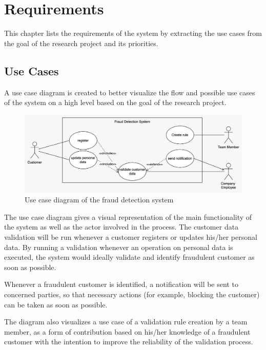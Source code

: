 \section{Requirements}

  This chapter lists the requirements of the system by extracting the use cases from the goal of the research project and its priorities. 

  \subsection{Use Cases}
    \label{use_cases}

    A use case diagram is created to better visualize the flow and possible use cases of the system on a high level based on the goal of the research project.

    \begin{figure}[!ht]
     \includegraphics[width=\textwidth]{diagrams/use-case.jpeg}
     \caption{Use case diagram of the fraud detection system}
     \label{fig:use_cases}
    \end{figure}

    The use case diagram gives a visual representation of the main functionality of the system as well as the actor involved in the process. The customer data validation will be run whenever a customer registers or updates his/her personal data. By running a validation whenever an operation on personal data is executed, the system would ideally validate and identify fraudulent customer as soon as possible. 
    
    Whenever a fraudulent customer is identified, a notification will be sent to concerned parties, so that necessary actions (for example, blocking the customer) can be taken as soon as possible. 

    The diagram also visualizes a use case of a validation rule creation by a team member, as a form of contribution based on his/her knowledge of a fraudulent customer with the intention to improve the reliability of the validation process.
    
